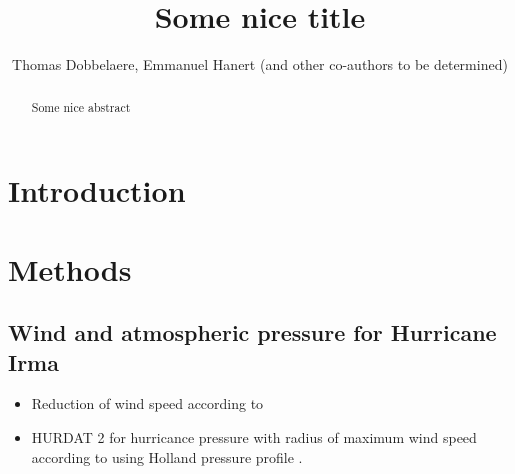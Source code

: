 \documentclass[11pt,a4paper]{article}
\title{Some nice title}
\author{Thomas Dobbelaere, Emmanuel Hanert (and other co-authors to be determined)}
\begin{document}
\maketitle
\begin{abstract}
Some nice abstract
\end{abstract}

\section{Introduction}


\section{Methods}
\subsection{Wind and atmospheric pressure for Hurricane Irma}
\begin{itemize}
    \item Reduction of wind speed according to \cite{harper2010guidelines}
    \item HURDAT 2 \citep{landsea2013atlantic} for hurricance pressure with radius of maximum wind speed according to \cite{knaff2018statistical} using Holland pressure profile \citep{lin2012hurricane}.
\end{itemize}
\end{document}
